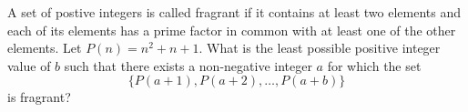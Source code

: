 A set of postive integers is called 
fragrant
 if it contains at least two elements and each of its elements has a prime factor in common with at least one of the other elements.  Let 
$P(n)=n^2+n+1$. 
  What is the least possible positive integer value of 
$b$
 such that there exists a non-negative integer 
$a$
 for which the set 
$$\{P(a+1),P(a+2),\ldots,P(a+b)\}$$
is fragrant?
